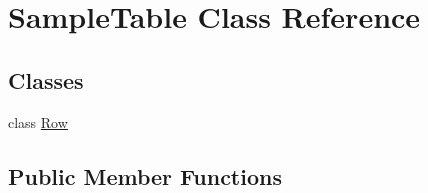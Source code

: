 \hypertarget{class_sample_table}{}\section{Sample\+Table Class Reference}
\label{class_sample_table}
\subsection*{Classes}
\begin{DoxyCompactItemize}
\item 
class \hyperlink{class_sample_table_1_1_row}{Row}
\end{DoxyCompactItemize}
\subsection*{Public Member Functions}
